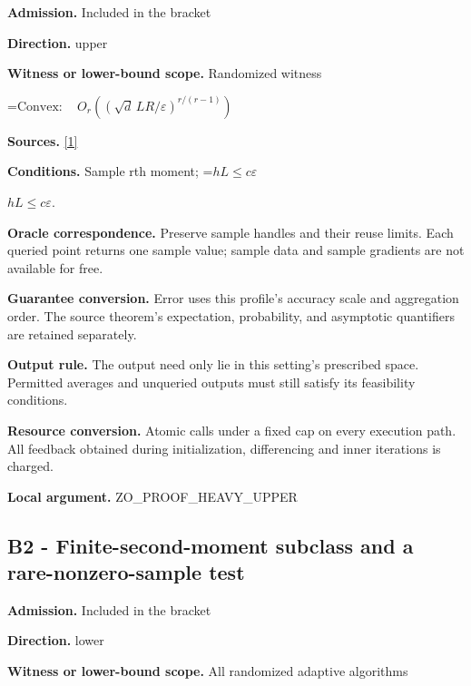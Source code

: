 \documentclass[10pt,a4paper]{article}
\newcommand{\AtlasMath}[1]{\par\begingroup\centering\setbox0=\hbox{$\displaystyle #1$}\ifdim\wd0>1.4\linewidth\typeout{ATLAS WIDE FORMULA: \the\wd0}\fi\ifdim\wd0>\linewidth\resizebox{\linewidth}{!}{\box0}\else\box0\fi\par\endgroup}
\newcommand{\AtlasInlineMath}[1]{\begingroup\setbox0=\hbox{$#1$}\ifdim\wd0>.4\linewidth\endgroup\AtlasMath{#1}\else\endgroup$#1$\fi}
\begin{document}
\textbf{Admission.} Included in the bracket



\textbf{Direction.} upper



\textbf{Witness or lower-bound scope.} Randomized witness



\AtlasMath{\mathrm{Convex}:\quad O_r((\sqrt d\,LR/\varepsilon)^{r/(r-1)})}


\textbf{Sources.} \href{https://jmlr.org/papers/volume18/16-632/16-632.pdf}{[1]}



\textbf{Conditions.} Sample rth moment; \AtlasInlineMath{hL\le c\varepsilon}.



\textbf{Oracle correspondence.} Preserve sample handles and their reuse limits. Each queried point returns one sample value; sample data and sample gradients are not available for free.



\textbf{Guarantee conversion.} Error uses this profile's accuracy scale and aggregation order. The source theorem's expectation, probability, and asymptotic quantifiers are retained separately.



\textbf{Output rule.} The output need only lie in this setting's prescribed space. Permitted averages and unqueried outputs must still satisfy its feasibility conditions.



\textbf{Resource conversion.} Atomic calls under a fixed cap on every execution path. All feedback obtained during initialization, differencing and inner iterations is charged.



\textbf{Local argument.} ZO\_PROOF\_HEAVY\_UPPER



\subsection{B2 - Finite-second-moment subclass and a rare-nonzero-sample test}


\textbf{Admission.} Included in the bracket



\textbf{Direction.} lower



\textbf{Witness or lower-bound scope.} All randomized adaptive algorithms
\end{document}
